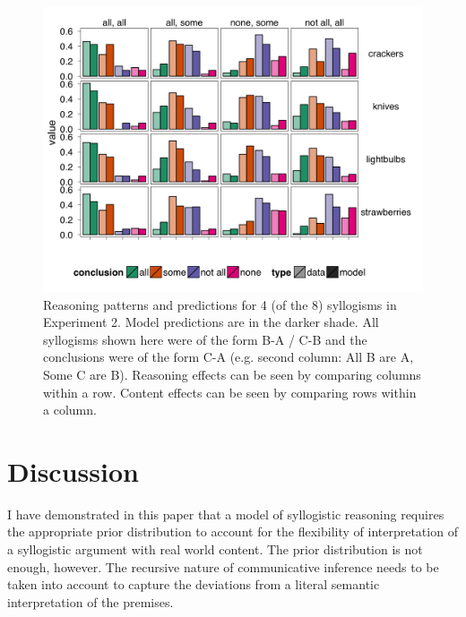 \documentclass{llncs} %
\begin{document}
\begin{figure}
\centering
    \includegraphics[width=\columnwidth]{figures/syllogismXdomain}
    \caption{Reasoning patterns and predictions for 4 (of the 8) syllogisms in Experiment 2. Model predictions are in the darker shade. All syllogisms shown here were of the form B-A / C-B and the conclusions were of the form C-A (e.g. second column: All B are A, Some C are B). Reasoning effects can be seen by comparing columns within a row. Content effects can be seen by comparing rows within a column.}
  \label{fig:syllogismXdomain}
\end{figure}

\section{Discussion}

I have demonstrated in this paper that a model of syllogistic reasoning requires the appropriate prior distribution to account for the flexibility of interpretation of a syllogistic argument with real world content. The prior distribution is not enough, however. The recursive nature of communicative inference needs to be taken into account to capture the deviations from a literal semantic interpretation of the premises. 





\end{document}
